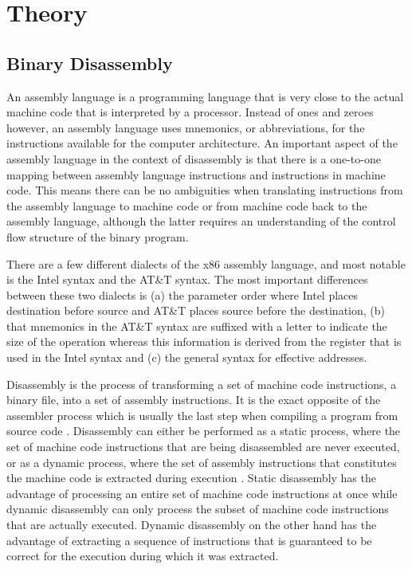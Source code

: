 \chapter{Theory}
\section{Binary Disassembly}

An assembly language is a programming language that is very close to the actual machine code that is interpreted by a processor. Instead of ones and zeroes however, an assembly language uses mnemonics, or abbreviations, for the instructions available for the computer architecture. An important aspect of the assembly language in the context of disassembly is that there is a one-to-one mapping between assembly language instructions and instructions in machine code. This means there can be no  ambiguities when translating instructions from the assembly language to machine code or from machine code back to the assembly language, although the latter requires an understanding of the control flow structure of the binary program.

There are a few different dialects of the x86 assembly language, and most notable is the Intel syntax and the AT\&T syntax. The most important differences between these two dialects is (a) the parameter order where Intel places destination before source and AT\&T places source before the destination, (b) that mnemonics in the AT\&T syntax are suffixed with a letter to indicate the size of the operation whereas this information is derived from the register that is used in the Intel syntax and (c) the general syntax for effective addresses.

Disassembly is the process of transforming a set of machine code instructions, a binary file, into a set of assembly instructions. It is the exact opposite of the assembler process which is usually the last step when compiling a program from source code \cite{Aho, Linn}. Disassembly can either be performed as a static process, where the set of machine code instructions that are being disassembled are never executed, or as a dynamic process, where the set of assembly instructions that constitutes the machine code is extracted during execution \cite{Linn}. Static disassembly has the advantage of processing an entire set of machine code instructions at once while dynamic disassembly can only process the subset of machine code instructions that are actually executed. Dynamic disassembly on the other hand has the advantage of extracting a sequence of instructions that is guaranteed to be correct for the execution during which it was extracted.

